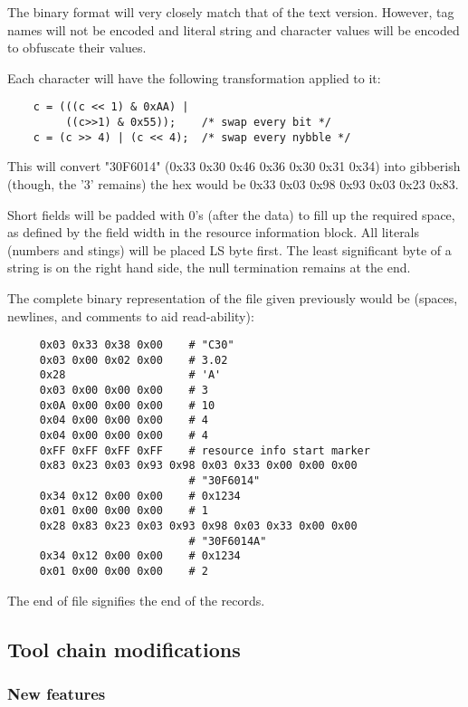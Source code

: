 \documentclass{article}
\begin{document}
  The binary format will very closely match that of the text version.  However,
  tag names will not be encoded and literal string and character values will
  be encoded to obfuscate their values.

  Each character will have the following transformation applied to it:
  \begin{verbatim}
    c = (((c << 1) & 0xAA) | 
         ((c>>1) & 0x55));    /* swap every bit */
    c = (c >> 4) | (c << 4);  /* swap every nybble */
  \end{verbatim}

  This will convert "30F6014" (0x33 0x30 0x46 0x36 0x30 0x31 0x34) into
  gibberish (though, the '3' remains) the hex would be 0x33 0x03 0x98 
  0x93 0x03 0x23 0x83.

\chgbarbegin
  Short fields will be padded with 0's (after the data) to fill up the 
  required space, as defined by the field width in the resource information
  block.
\chgbarend
  All literals (numbers and stings) will be placed LS byte first.  The least
  significant byte of a string is on the right hand side, the null termination
  remains at the end.

  The complete binary representation of the file given previously would be 
  (spaces, newlines, and comments to aid read-ability):
  \begin{verbatim}
     0x03 0x33 0x38 0x00    # "C30"
     0x03 0x00 0x02 0x00    # 3.02
     0x28                   # 'A'
     0x03 0x00 0x00 0x00    # 3
     0x0A 0x00 0x00 0x00    # 10
     0x04 0x00 0x00 0x00    # 4
     0x04 0x00 0x00 0x00    # 4
     0xFF 0xFF 0xFF 0xFF    # resource info start marker
     0x83 0x23 0x03 0x93 0x98 0x03 0x33 0x00 0x00 0x00
                            # "30F6014"
     0x34 0x12 0x00 0x00    # 0x1234
     0x01 0x00 0x00 0x00    # 1
     0x28 0x83 0x23 0x03 0x93 0x98 0x03 0x33 0x00 0x00
                            # "30F6014A"
     0x34 0x12 0x00 0x00    # 0x1234
     0x01 0x00 0x00 0x00    # 2
   \end{verbatim}

  The end of file signifies the end of the records.

\subsection{Tool chain modifications}

  \subsubsection{New features}
\end{document}
